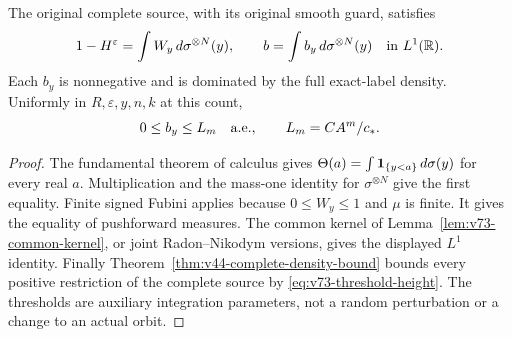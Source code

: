 \begin{lemma}
\label{lem:v73-threshold-mixture}
The original complete source, with its original smooth guard, satisfies
\begin{equation}\label{eq:v73-threshold-mixture}
 1-H^\varepsilon=\int W_y\,d\sigma^{\otimes N}(y),\qquad
 b=\int b_y\,d\sigma^{\otimes N}(y)\quad\hbox{in }L^1(\R).
\end{equation}
Each $b_y$ is nonnegative and is dominated by the full exact-label
density. Uniformly in $R,\varepsilon,y,n,k$ at this count,
\begin{equation}\label{eq:v73-threshold-height}
 0\le b_y\le L_m\quad\hbox{a.e.},\qquad L_m=C A^m/c_*.
\end{equation}
\end{lemma}
\begin{proof}
The fundamental theorem of calculus gives
$\Theta(a)=\int\mathbf1_{\{y<a\}}\,d\sigma(y)$ for every real $a$.
Multiplication and the mass-one identity for $\sigma^{\otimes N}$
give the first equality. Finite signed Fubini applies because
$0\le W_y\le1$ and $\mu$ is finite. It gives the equality of
pushforward measures. The common kernel of
Lemma~\ref{lem:v73-common-kernel}, or joint Radon--Nikodym versions,
gives the displayed $L^1$ identity. Finally
Theorem~\ref{thm:v44-complete-density-bound} bounds every positive
restriction of the complete source by \eqref{eq:v73-threshold-height}.
The thresholds are auxiliary integration parameters, not a random
perturbation or a change to an actual orbit.
\end{proof}

